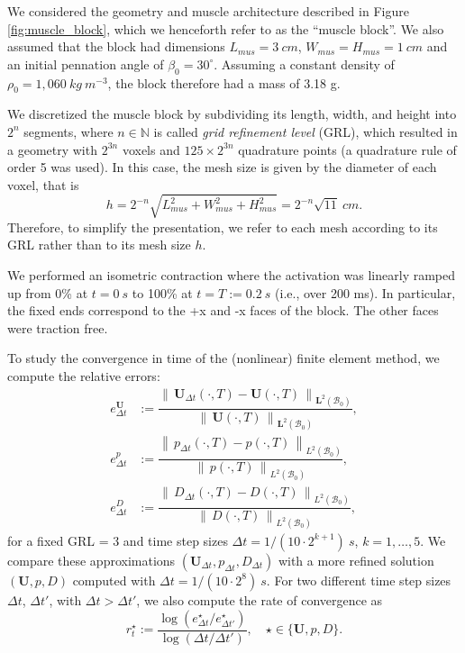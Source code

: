 \documentclass{sfuthesis}
\numberwithin{equation}{section}
\numberwithin{figure}{chapter}
\numberwithin{table}{chapter}
\theoremstyle{definition}
\def\*#1{{\mathbf{#1}}} %
\newcommand{\B}{\mathcal{B}}
\newcommand{\norm}[1]{{\left\| \, #1 \, \right\|}}
\begin{document}
We considered the geometry and muscle architecture described in Figure \ref{fig:muscle_block}, which we henceforth refer to as the ``muscle block''. We also assumed that the block had dimensions $L_{mus} = 3 \ \unit{cm}$, $W_{mus} = H_{mus} = 1 \ \unit{cm}$ and an initial pennation angle of $\beta_0 = 30^\circ$. Assuming a constant density of $\rho_0 = 1,060 \ \unit{kg \ m^{-3}}$, the block therefore had a mass of 3.18 \unit{g}. 

We discretized the muscle block by subdividing its length, width, and height into $2^n$ segments, where $n \in \mathbb{N}$ is called \textit{grid refinement level} (GRL), which resulted in a geometry with $2^{3n}$ voxels and $125 \times 2^{3n}$ quadrature points (a quadrature rule of order 5 was used). In this case, the mesh size is given by the diameter of each voxel, that is
\[
    h = 2^{-n} \sqrt{L_{mus}^2 + W_{mus}^2 + H_{mus}^2} = 2^{-n} \sqrt{11} \ \unit{cm}.
\]
Therefore, to simplify the presentation, we refer to each mesh according to its GRL rather than to its mesh size $h$.

We performed an isometric contraction where the activation was linearly ramped up from 0\% at $t=0 \ \unit{s}$ to 100\% at $t = T := 0.2 \ \unit{s}$ (i.e., over 200 ms). In particular, the fixed ends correspond to the +x and -x faces of the block. The other faces were traction free.

To study the convergence in time of the (nonlinear) finite element method, we compute the relative errors:
\begin{subequations}
    \begin{eqnarray}
        e^{\*U}_{\Delta t} &:= \dfrac{\norm{\*U_{\Delta t}(\cdot,T) - \*U(\cdot,T)}_{\*L^2(\B_0)}}{\norm{\*U(\cdot,T)}_{\*L^2(\B_0)}}, \\
        e^p_{\Delta t} &:= \dfrac{\norm{p_{\Delta t}(\cdot,T) - p(\cdot,T)}_{L^2(\B_0)}}{\norm{p(\cdot,T)}_{L^2(\B_0)}}, \\
        e^D_{\Delta t} &:= \dfrac{\norm{D_{\Delta t}(\cdot,T) - D(\cdot,T)}_{L^2(\B_0)}}{\norm{D(\cdot,T)}_{L^2(\B_0)}},
    \end{eqnarray}
\end{subequations}
for a fixed GRL = 3 and time step sizes $\Delta t = 1/(10 \cdot 2^{k+1}) \ \unit{s}$, $k = 1, \dots, 5$. We compare these approximations $(\*U_{\Delta t}, p_{\Delta t}, D_{\Delta t})$ with a more refined solution $(\*U, p, D)$ computed with $\Delta t = 1/(10 \cdot 2^8) \ \unit{s}$. For two different time step sizes $\Delta t$, $\Delta t'$, with $\Delta t > \Delta t'$, we also compute the rate of convergence as
\begin{equation}
    r^{\star}_t := \dfrac{\log \left(e^\star_{\Delta t} / e^\star_{\Delta t'} \right)}{\log \left(\Delta t / \Delta t'  \right)}, \quad \star \in \{ \*U, p, D \}.
\end{equation}
\end{document}
